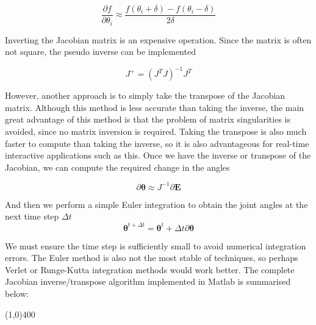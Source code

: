 \documentclass[paper=a4, fontsize=11pt]{scrartcl} %
\numberwithin{equation}{section} %
\numberwithin{figure}{section} %
\numberwithin{table}{section} %
\newcommand{\vect}[1]{\mathbf{#1}}
\newcommand{\params}{\boldsymbol{\theta}}
\newcommand{\dn}[1]{\partial{#1}}
\begin{document}
\begin{equation}
\frac{\dn{f}}{\dn{\theta_i}} \approx \frac{f(\theta_i+\delta) - f(\theta_i-\delta)}{2\delta} 
\end{equation}
 
Inverting the Jacobian matrix is an expensive operation. Since the matrix is often not square, the pseudo inverse can be implemented

\begin{equation}
J^+ = (J^TJ)^{-1}J^T
\end{equation}

However, another approach is to simply take the transpose of the Jacobian matrix. Although this method is less accurate than taking the inverse, the main great advantage of this method is that the problem of matrix singularities is avoided, since no matrix inversion is required. Taking the transpose is also much faster to compute than taking the inverse, so it is also advantageous for real-time interactive applications such as this. Once we have the inverse or transpose of the Jacobian, we can compute the required change in the angles

\begin{equation}
\partial \params \approx J^{-1} \partial \vect{E}
\end{equation}

And then we perform a simple Euler integration to obtain the joint angles at the next time step $\Delta t$
\vspace{1mm}
\begin{equation}
\params^{t+\Delta t} = \params^t + \Delta t \partial \params
\end{equation}

We must ensure the time step is sufficiently small to avoid numerical integration errors. The Euler method is also not the most stable of techniques, so perhaps Verlet or Runge-Kutta integration methods would work better. The complete Jacobian inverse/transpose algorithm implemented in Matlab is summarised below:
\vspace{-2mm}
\begin{center}
\line(1,0){400}
\end{center}
\end{document}
